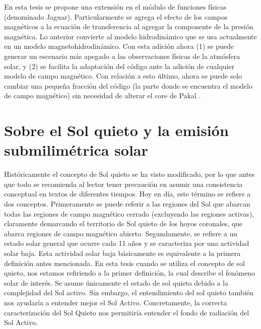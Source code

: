 En esta tesis se propone una extensi\'on en el m\'odulo de funciones f\'isicas (denominado Jaguar). Particularmente se agrega el efecto de los campos magn\'eticos a la ecuaci\'on de transferencia al agregar la componente de la presi\'on magn\'etica. Lo anterior convierte al modelo hidrodin\'amico que se usa actualmente en un modelo magnetohidrodin\'amico. Con esta adici\'on ahora (1) se puede generar un escenario m\'as apegado a las observaciones f\'isicas de la atm\'osfera solar, y (2) se facilita la adaptaci\'on del c\'odigo ante la adici\'on de cualquier modelo de campo magn\'etico. Con relaci\'on a esto \'ultimo, ahora se puede solo cambiar una peque\~na fracci\'on del c\'odigo (la parte donde se encuentra el modelo de campo magn\'etico) sin necesidad de alterar el core de Pakal . 



\section{Sobre el Sol quieto y la emisi\'on submilim\'etrica solar}
Hist\'oricamente el concepto de Sol quieto se ha visto modificado, por lo que antes que todo se recomienda al lector tener precauci\'on en asumir una consistencia conceptual en textos de diferentes tiempos. Hoy en d\'ia, este t\'ermino se refiere a dos conceptos. Primeramente se puede referir a las regiones del Sol que abarcan todas las regiones de campo magn\'etico cerrado (excluyendo las regiones activas), claramente demarcando el territorio de Sol quieto de los hoyos coronales, que abarca regiones de campo magn\'etico abierto.
Segundamente, se refiere a un estado solar general que ocurre cada 11 a\~nos y se caracteriza por una actividad solar baja. Esta actividad solar baja b\'asicamente es equivalente a la primera definici\'on antes mencionada. En esta tesis cuando se utiliza el concepto de sol quieto, nos estamos refiriendo a la primer definici\'on, la cual describe el fen\'omeno solar de inter\'es. Se asume \'unicamente el estado de sol quieto debido a la complejidad del Sol activo. Sin embargo, el entendimiento del sol quieto tambi\'en nos ayudar\'ia a entender mejor el Sol Activo. Concretamente, la correcta caracterizaci\'on del Sol Quieto nos permitir\'ia entender el fondo de radiaci\'on del Sol Activo.

